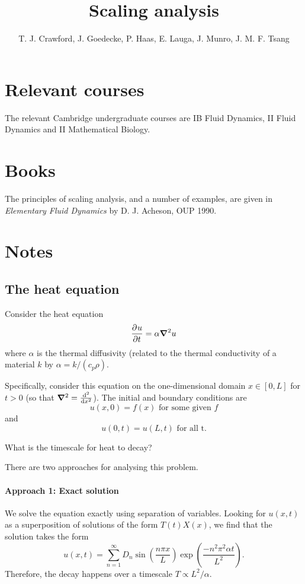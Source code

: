 \documentclass{article}
\title{Scaling analysis}
\author{T. J. Crawford, J. Goedecke, P. Haas, E. Lauga, J. Munro, J. M. F. Tsang}
\begin{document}
\maketitle

\section{Relevant courses}

The relevant Cambridge undergraduate courses are IB Fluid Dynamics, II Fluid
Dynamics and II Mathematical Biology.

\section{Books}

The principles of scaling analysis, and a number of examples, are given in
\textit{Elementary Fluid Dynamics} by D. J. Acheson, OUP 1990.

\section{Notes}

\subsection{The heat equation}

Consider the heat equation
$$ \dpd{u}{t} = \alpha\grad^2 u  $$
where $\alpha$ is the thermal diffusivity (related to the thermal conductivity
of a material $k$ by $\alpha = k/(c_p \rho)$. 

Specifically, consider this equation on the one-dimensional domain
$x\in[0,L]$ for $t>0$ (so that $\grad^2 = \od[2]{}{x}$). The initial and boundary conditions are 
$$ u(x,0) = f(x) \text{ for some given $f$} $$
and
$$ u(0,t) = u(L,t) \text{ for all t.} $$

What is the timescale for heat to decay? 

There are two approaches for analysing this problem.

\paragraph{Approach 1: Exact solution} We solve the equation exactly using
separation of variables. Looking for $u(x,t)$ as a superposition of solutions of
the form $T(t)X(x)$, we find that the solution takes the form 
$$ u(x,t) = \sum_{n=1}^\infty D_n \sin\left(\frac{n\pi x}{L}\right)
\exp\left(\frac{-n^2 \pi^2 \alpha t}{L^2}\right). $$
Therefore, the decay happens over a timescale $T \propto L^2/\alpha$.
\end{document}
